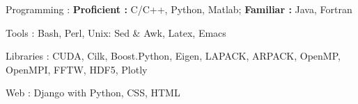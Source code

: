


\begin{cvskills}


\cvskill
{Programming : } %
{\textbf{Proficient :}  C/C++, Python, Matlab; 
  \textbf{Familiar :} Java, Fortran} %

\cvskill
{Tools : }
{Bash, Perl, Unix: Sed \& Awk, Latex, Emacs}

\cvskill
{Libraries : }
{CUDA, Cilk, Boost.Python, Eigen, LAPACK, ARPACK, OpenMP, OpenMPI, FFTW, HDF5, Plotly}


\cvskill
{Web : } %
{Django with Python, CSS, HTML} %




\end{cvskills}